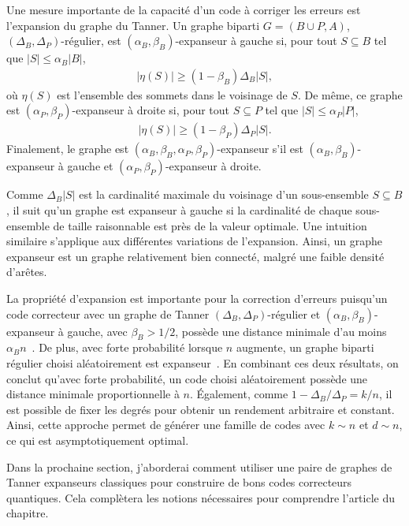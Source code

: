 Une mesure importante de la capacité d'un code à corriger les erreurs
est l'expansion du graphe du Tanner.
Un graphe biparti $G = (B\cup P, A)$, $(\Delta_B, \Delta_P)$-régulier,
est $(\alpha_B, \beta_B)$-expanseur à gauche si,
pour tout $S \subseteq B$ tel que $|S| \leq \alpha_B |B|$,
\begin{align}
	|\eta(S)| \geq (1 - \beta_B) \Delta_B |S|,
\end{align}
où $\eta(S)$ est l'ensemble des sommets dans le voisinage de $S$.
De même,
ce graphe est $(\alpha_P, \beta_P)$-expanseur à droite si,
pour tout $S \subseteq P$ tel que $|S| \leq \alpha_P |P|$,
\begin{align}
	|\eta(S)| \geq (1 - \beta_P) \Delta_P |S|.
\end{align}
Finalement,
le graphe est $(\alpha_B, \beta_B, \alpha_P, \beta_P)$-expanseur
s'il est $(\alpha_B, \beta_B)$-expanseur à gauche
et $(\alpha_P, \beta_P)$-expanseur à droite.

Comme $\Delta_B|S|$ est la cardinalité maximale du voisinage d'un
sous-ensemble $S \subseteq B$,
il suit qu'un graphe est expanseur à gauche si la cardinalité de 
chaque sous-ensemble de taille raisonnable est près de la valeur optimale.
Une intuition similaire s'applique aux différentes variations de l'expansion.
Ainsi,
un graphe expanseur est un graphe relativement bien connecté,
malgré une faible densité d'arêtes.

La propriété d'expansion est importante pour la correction d'erreurs puisqu'un code correcteur
avec un graphe de Tanner $(\Delta_B, \Delta_P)$-régulier et $(\alpha_B, \beta_B)$-expanseur à gauche,
avec $\beta_B > 1/2$,
possède une distance minimale d'au moins $\alpha_B n$~\cite{sipser_expander_1996}.
De plus,
avec forte probabilité lorsque $n$ augmente,
un graphe biparti régulier choisi aléatoirement est expanseur~\cite{sipser_expander_1996}.
En combinant ces deux résultats,
on conclut qu'avec forte probabilité,
un code choisi aléatoirement possède une distance minimale proportionnelle à $n$.
Également, comme $1 - \Delta_B / \Delta_P = k/n$,
il est possible de fixer les degrés pour obtenir un rendement arbitraire et constant.
Ainsi,
cette approche permet de générer une famille de codes avec $k \sim n$ et $d \sim n$,
ce qui est asymptotiquement optimal.

Dans la prochaine section,
j'aborderai comment utiliser une paire de graphes de Tanner expanseurs classiques
pour construire de bons codes correcteurs quantiques.
Cela complètera les notions nécessaires pour comprendre l'article du chapitre.

